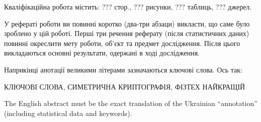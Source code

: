 
\abstractUkr

Кваліфікаційна робота містить: ??? стор., ??? рисунки, ??? таблиць, ??? джерел.

У рефераті роботи ви повинні коротко (два-три абзаци) викласти, що саме
було зроблено у цій роботі. Перші три речення реферату (після статистичних
даних) повинні окреслити мету роботи, об'єкт та предмет дослідження. Після
цього викладаються основні результати, одержані в ході дослідження.

Наприкінці анотації великими літерами зазначаються ключові слова. Ось так:

\MakeUppercase{КЛЮЧОВІ СЛОВА, СИМЕТРИЧНА КРИПТОГРАФІЯ, ФІЗТЕХ НАЙКРАЩІЙ}


%

\abstractEng

The English abstract must be the exact translation of the Ukrainian
``annotation'' (including statistical data and keywords).

\clearpage
